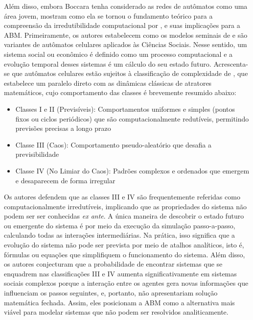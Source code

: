 \documentclass[12pt,oneside,a4paper,brazil,sumario=tradicional]{abntex2}
\begin{document}
Além disso, embora Boccara tenha considerado as redes de autômatos como uma área jovem, \textcite{namatame2016} mostram como ela se tornou o fundamento teórico para a compreensão da irredutibilidade computacional por \textcite{wolfram2002}, e suas implicações para a ABM. Primeiramente, os autores estabelecem como os modelos seminais de \textcite{schelling1971} e \textcite{sakoda1971} são variantes de autômatos celulares aplicados às Ciências Sociais. Nesse sentido, um sistema social ou econômico é definido como um processo computacional e a evolução temporal desses sistemas é um cálculo do seu estado futuro. Acrescenta-se que autômatos celulares estão sujeitos à classificação de complexidade de \textcite{wolfram1984}, que estabelece um paralelo direto com as dinâmicas clássicas de atratores matemáticos, cujo comportamento das classes é brevemente resumido abaixo:

\begin{itemize}
  \item Classes I e II (Previsíveis): Comportamentos uniformes e simples (pontos fixos ou ciclos periódicos) que são computacionalmente redutíveis, permitindo previsões precisas a longo prazo
  \item Classe III (Caos): Comportamento pseudo-aleatório que desafia a previsibilidade
  \item Classe IV (No Limiar do Caos): Padrões complexos e ordenados que emergem e desaparecem de forma irregular
\end{itemize}

Os autores defendem que as classes III e IV são frequentemente referidas como computacionalmente irredutíveis, implicando que as propriedades do sistema não podem ser ser conhecidas \textit{ex ante}. A única maneira de descobrir o estado futuro ou emergente do sistema é por meio da execução da simulação passo-a-passo, calculando todas as interações intermediárias. Na prática, isso significa que a evolução do sistema não pode ser prevista por meio de atalhos analíticos, isto é, fórmulas ou equações que simplifiquem o funcionamento do sistema. Além disso, os autores conjecturam que a probabilidade de encontrar sistemas que se enquadrem nas classificações III e IV aumenta significativamente em sistemas sociais complexos porque a interação entre os agentes gera novas informações que influenciam os passos seguintes, e, portanto, não apresentariam solução matemática fechada. Assim, eles posicionam a ABM como a alternativa mais viável para modelar sistemas que não podem ser resolvidos analiticamente.
\end{document}
